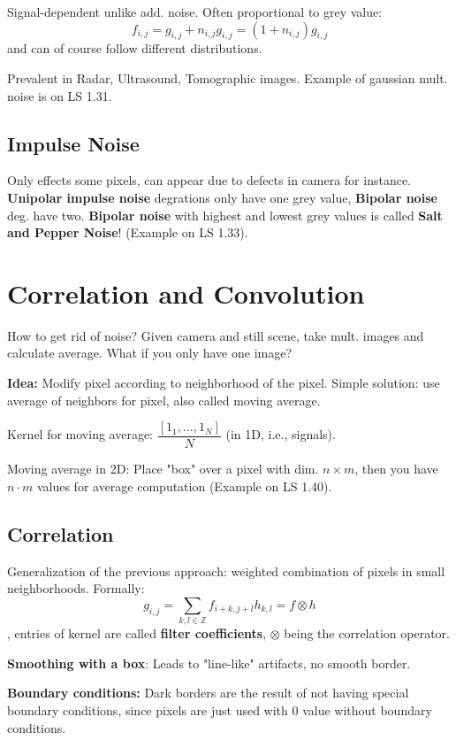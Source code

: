 Signal-dependent unlike add. noise. Often proportional to grey value: $$f_{i,j} = g _{i,j} + n_{i,j}g_{i,j} = (1+n_{i,j}) g_{i,j}$$ and can of course follow different distributions.

Prevalent in Radar, Ultrasound, Tomographic images. Example of gaussian mult. noise is on LS 1.31.

\subsection{Impulse Noise}

Only effects some pixels, can appear due to defects in camera for instance. \textbf{Unipolar impulse noise} degrations only have one grey value, \textbf{Bipolar noise} deg. have two. \textbf{Bipolar noise} with highest and lowest grey values is called \textbf{Salt and Pepper Noise}! (Example on LS 1.33).

\section{Correlation and Convolution}

How to get rid of noise? Given camera and still scene, take mult. images and calculate average. What if you only have one image?

\textbf{Idea:} Modify pixel according to neighborhood of the pixel. Simple solution: use average of neighbors for pixel, also called moving average.

Kernel for moving average: $\dfrac{[1_1, \dots, 1_N]}{N}$ (in 1D, i.e., signals).

Moving average in 2D: Place "box" over a pixel with dim. $n\times m$, then you have $n\cdot m$ values for average computation (Example on LS 1.40).

\subsection{Correlation}
Generalization of the previous approach: weighted combination of pixels in small neighborhoods. Formally: $$g_{i,j} = \sum\limits_{k,l \in \mathbb{Z}} f_{i+k,j+l} h_{k,l} = f \otimes h$$, entries of kernel are called \textbf{filter coefficients}, $\otimes$ being the correlation operator.

\textbf{Smoothing with a box}: Leads to "line-like" artifacts, no smooth border.

\textbf{Boundary conditions:} Dark borders are the result of not having special boundary conditions, since pixels are just used with 0 value without boundary conditions.


